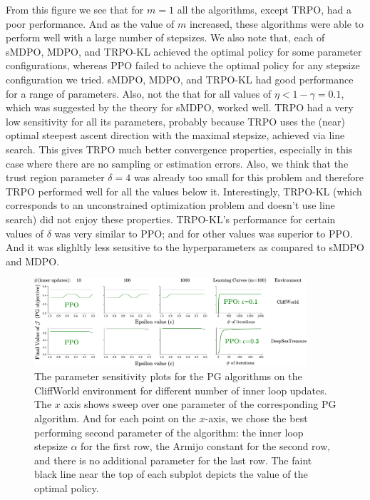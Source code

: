 \documentclass[a4paper, 10pt]{article}
\begin{document}
From this figure we see that for $m=1$ all the algorithms, except TRPO, had a poor performance. And as the value of $m$ increased, these algorithms were able to perform well with a large number of stepsizes. We also note that, each of sMDPO, MDPO, and TRPO-KL achieved the optimal policy for some parameter configurations, whereas PPO failed to achieve the optimal policy for any stepsize configuration we tried. sMDPO, MDPO, and TRPO-KL had good performance for a range of parameters. Also, not the that for all values of $\eta < 1 - \gamma = 0.1$, which was suggested by the theory for sMDPO, worked well. TRPO had a very low sensitivity for all its parameters, probably because TRPO uses the (near) optimal steepest ascent direction with the maximal stepsize, achieved via line search. This gives TRPO much better convergence properties, especially in this case where there are no sampling or estimation errors. Also, we think that the trust region parameter $\delta = 4$ was already too small for this problem and therefore TRPO performed well for all the values below it. Interestingly, TRPO-KL (which corresponds to an unconstrained optimization problem and doesn't use line search) did not enjoy these properties. TRPO-KL's performance for certain values of $\delta$ was very similar to PPO; and for other values was superior to PPO. And it was slighltly less sensitive to the hyperparameters as compared to sMDPO and MDPO.

\begin{figure}[t]
    \centering
    \includegraphics[width=0.9\textwidth]{ppo.pdf}
    \caption{The parameter sensitivity plots for the  PG algorithms on the CliffWorld environment for different number of inner loop updates. The $x$ axis shows sweep over one parameter of the corresponding PG algorithm. And for each point on the $x$-axis, we chose the best performing second parameter of the algorithm: the inner loop stepsize $\alpha$ for the first row, the Armijo constant for the second row, and there is no additional parameter for the last row. The faint black line near the top of each subplot depicts the value of the optimal policy.
    \label{fig:ppo_plots}}
\end{figure}
\end{document}
